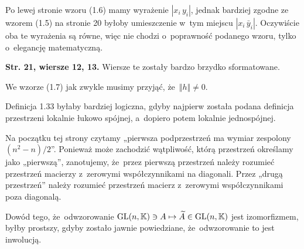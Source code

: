 \documentclass[a4paper,11pt]{article}
\begin{document}
\vspace{\spaceFour}





 Po lewej stronie wzoru (1.6) mamy wyrażenie
$| x_{ i } \, y_{ i } |$, jednak bardziej zgodne ze wzorem (1.5) na stronie
20 byłoby umieszczenie w~tym miejscu $| x_{ i } \, \bar{y}_{ i } |$.
Oczywiście oba te wyrażenia są równe, więc nie chodzi o~poprawność
podanego wzoru, tylko o~elegancję matematyczną.

\vspace{\spaceFour}





\noindent
\textbf{Str. 21, wiersze 12, 13.} Wiersze te zostały bardzo brzydko
sformatowane.

\vspace{\spaceFour}





 We wzorze (1.7) jak zwykle musimy przyjąć, że~$\Vert h \Vert \neq 0$.

\vspace{\spaceFour}





 Definicja 1.33 byłaby bardziej logiczna, gdyby najpierw
została podana definicja przestrzeni lokalnie łukowo spójnej, a~dopiero
potem lokalnie jednospójnej.

\vspace{\spaceFour}





 Na początku tej strony czytamy „pierwsza podprzestrzeń ma
wymiar zespolony $( n^{ 2 } - n ) / 2$”. Ponieważ może zachodzić wątpliwość,
którą przestrzeń określamy jako „pierwszą”, zanotujemy, że~przez pierwszą
przestrzeń należy rozumieć przestrzeń macierzy z~zerowymi współczynnikami na
diagonali. Przez „drugą przestrzeń” należy rozumieć przestrzeń macierz
z~zerowymi współczynnikami poza diagonalą.

\vspace{\spaceFour}





 Dowód tego, że~odwzorowanie
$\mathrm{GL}( n, \mathbb{K} ) \ni A \mapsto \widetilde{A} \in \mathrm{GL}( n, \mathbb{K} )$ jest izomorfizmem,
byłby prostszy, gdyby zostało jawnie powiedziane, że~odwzorowanie to jest
inwolucją.
\end{document}
